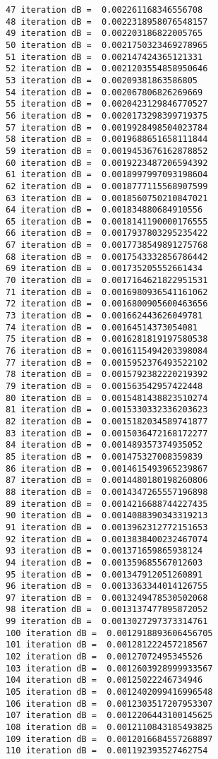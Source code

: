 \documentclass[11pt,a4paper]{article}
\begin{document}
\begin{verbatim}
47 iteration dB =  0.002261168346556708
48 iteration dB =  0.0022318958076548157
49 iteration dB =  0.002203186822005765
50 iteration dB =  0.0021750323469278965
51 iteration dB =  0.002147424365121331
52 iteration dB =  0.0021203554858950646
53 iteration dB =  0.00209381863586805
54 iteration dB =  0.002067806826269669
55 iteration dB =  0.0020423129846770527
56 iteration dB =  0.0020173298399719375
57 iteration dB =  0.0019928498504023784
58 iteration dB =  0.0019688651658111844
59 iteration dB =  0.0019453676162878852
60 iteration dB =  0.0019223487206594392
61 iteration dB =  0.0018997997093198604
62 iteration dB =  0.0018777115568907599
63 iteration dB =  0.0018560750210847021
64 iteration dB =  0.001834880684910556
65 iteration dB =  0.0018141190000176555
66 iteration dB =  0.0017937803295235422
67 iteration dB =  0.0017738549891275768
68 iteration dB =  0.0017543332856786442
69 iteration dB =  0.001735205552661434
70 iteration dB =  0.0017164621822951531
71 iteration dB =  0.0016980936541161062
72 iteration dB =  0.0016800905600463656
73 iteration dB =  0.001662443626049781
74 iteration dB =  0.00164514373054081
75 iteration dB =  0.0016281819197580538
76 iteration dB =  0.0016115494203398084
77 iteration dB =  0.0015952376493522102
78 iteration dB =  0.0015792382220219392
79 iteration dB =  0.001563542957422448
80 iteration dB =  0.0015481438823510274
81 iteration dB =  0.0015330332336203623
82 iteration dB =  0.0015182034589741877
83 iteration dB =  0.0015036472168172277
84 iteration dB =  0.001489357374935052
85 iteration dB =  0.001475327008359839
86 iteration dB =  0.0014615493965239867
87 iteration dB =  0.0014480180198260806
88 iteration dB =  0.0014347265557196898
89 iteration dB =  0.0014216688744227435
90 iteration dB =  0.0014088390343319213
91 iteration dB =  0.0013962312772151653
92 iteration dB =  0.0013838400232467074
93 iteration dB =  0.001371659865938124
94 iteration dB =  0.001359685567012603
95 iteration dB =  0.001347912051260891
96 iteration dB =  0.0013363344014126755
97 iteration dB =  0.0013249478530502068
98 iteration dB =  0.0013137477895872052
99 iteration dB =  0.0013027297373314761
100 iteration dB =  0.0012918893606456705
101 iteration dB =  0.001281222457218567
102 iteration dB =  0.00127072495345526
103 iteration dB =  0.0012603928999933567
104 iteration dB =  0.00125022246734946
105 iteration dB =  0.0012402099416996548
106 iteration dB =  0.0012303517207953307
107 iteration dB =  0.0012206443100145625
108 iteration dB =  0.0012110843185493825
109 iteration dB =  0.0012016684557268897
110 iteration dB =  0.001192393527462754

\end{verbatim}
\end{document}
